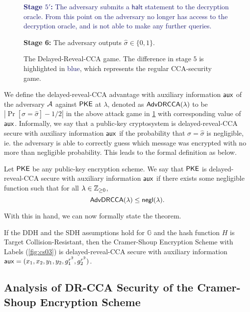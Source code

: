 \begin{figure}[ht!]
\begin{framed}
		\vspace{2mm}
		
		\textcolor{MidnightBlue}{\textbf{Stage $5'$:} The adversary submits a $\mathsf{halt}$ statement to the decryption oracle. From this point on the adversary no longer has access to the decryption oracle, and is not able to make any further queries.}
		
		\vspace{2mm}
		
		\textbf{Stage 6:} The adversary outputs $\hat{\sigma}\in\{0,1\}$.
	\end{framed}
	\caption{The Delayed-Reveal-CCA game. The difference in stage $5$ is highlighted in \textcolor{MidnightBlue}{blue}, which represents the regular CCA-security game.}
	\label{fig:dcca}
\end{figure}

We define the delayed-reveal-CCA advantage with auxiliary information $\mathsf{aux}$ of the adversary $\mathcal{A}$ against $\mathsf{PKE}$ at $\lambda$, denoted as $\mathsf{AdvDRCCA}(\lambda)$ to be $|\Pr[\sigma = \hat{\sigma}] - 1/2|$ in the above attack game in \cref{fig:dcca} with corresponding value of $\mathsf{aux}$. Informally, we say that a public-key cryptosystem is delayed-reveal-CCA secure with auxiliary information $\mathsf{aux}$ if the probability that $\sigma = \hat{\sigma}$ is negligible, ie. the adversary is able to correctly guess which message was encrypted with no more than negligible probability. This leads to the formal definition as below.

\begin{definition}
	Let $\mathsf{PKE}$ be any public-key encryption scheme. We say that $\mathsf{PKE}$ is delayed-reveal-CCA secure with auxiliary information $\mathsf{aux}$ if there exists some negligible function such that for all $\lambda\in\mathbb{Z}_{\geq 0}$, $$\mathsf{AdvDRCCA}(\lambda)\leq\mathsf{negl}(\lambda).$$
\end{definition}

With this in hand, we can now formally state the theorem.

\begin{theorem}
	\label{thm:drcca-cs}
	If the DDH and the SDH assumptions hold for $\mathbb{G}$ and the hash function $H$ is Target Collision-Resistant, then the Cramer-Shoup Encryption Scheme with Labels (\cref{fig:cs03}) is delayed-reveal-CCA secure with auxiliary information $\mathsf{aux} = (x_1,x_2,y_1,y_2,g_1^{r^2},g_2^{r^2})$.
\end{theorem}

\subsection{Analysis of DR-CCA Security of the Cramer-Shoup Encryption Scheme}

